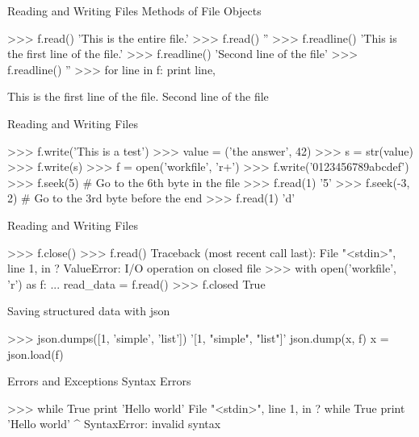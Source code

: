\documentclass[11pt]{beamer}
\begin{document}
\begin{frame}[containsverbatim]{Reading and Writing Files}
Methods of File Objects
\begin{python}
>>> f.read()
'This is the entire file.\n'
>>> f.read()
''
>>> f.readline()
'This is the first line of the file.\n'
>>> f.readline()
'Second line of the file\n'
>>> f.readline()
''
>>> for line in f:
        print line,

This is the first line of the file.
Second line of the file
\end{python}
\end{frame}


\begin{frame}[containsverbatim]{Reading and Writing Files}
\begin{python}
>>> f.write('This is a test\n')
>>> value = ('the answer', 42)
>>> s = str(value)
>>> f.write(s)
>>> f = open('workfile', 'r+')
>>> f.write('0123456789abcdef')
>>> f.seek(5)     # Go to the 6th byte in the file
>>> f.read(1)
'5'
>>> f.seek(-3, 2) # Go to the 3rd byte before the end
>>> f.read(1)
'd'
\end{python}
\end{frame}


\begin{frame}[containsverbatim]{Reading and Writing Files}
\begin{python}
>>> f.close()
>>> f.read()
Traceback (most recent call last):
  File "<stdin>", line 1, in ?
ValueError: I/O operation on closed file
>>> with open('workfile', 'r') as f:
...    read_data = f.read()
>>> f.closed
True
\end{python}
\end{frame}

\begin{frame}[containsverbatim]{Saving structured data with json}
\begin{python}
>>> json.dumps([1, 'simple', 'list'])
'[1, "simple", "list"]'
json.dump(x, f)
x = json.load(f)
\end{python}
\end{frame}


\begin{frame}[containsverbatim]{Errors and Exceptions}
Syntax Errors
\begin{python}
>>> while True print 'Hello world'
  File "<stdin>", line 1, in ?
    while True print 'Hello world'
                   ^
SyntaxError: invalid syntax
\end{python}
\end{frame}
\end{document}
